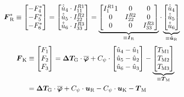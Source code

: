 \begin{equation}
\begin{split}
\boldsymbol{F}^*_{\text{R}} &\equiv \begin{bmatrix}-F^*_{\text{4}} \\ -F^*_{\text{5}} \\ -F^*_{\text{6}} \end{bmatrix} = 
\begin{bmatrix}
\hat{\dot{u}}_{\text{4}} \cdot I^{R1}_{\text{11}} \\ \hat{\dot{u}}_{\text{5}}\cdot I^{R2}_{\text{22}} \\ \hat{\dot{u}}_{\text{6}}\cdot I^{R3}_{\text{33}}
\end{bmatrix} = \underbrace{\begin{bmatrix}
I^{R1}_{\text{1}}1 & 0 & 0 \\ 0 & I^{R2}_{\text{22}} & 0 \\ 0 & 0 & I^{R3}_{\text{33}}
\end{bmatrix}}_{\equiv \boldsymbol{I}_{\text{R}}} \cdot \underbrace{\begin{bmatrix}
\hat{\dot{u}}_{\text{4}} \\ \hat{\dot{u}}_{\text{5}} \\ \hat{\dot{u}}_{\text{6}}
\end{bmatrix}}_{\equiv \boldsymbol{\dot{u}}_{\text{R}}}
\end{split}
\end{equation}
\begin{equation}
\begin{split}
\boldsymbol{F}_{\text{K}} &\equiv \begin{bmatrix}
F_{\text{1}} \\ F_{\text{2}} \\ F_{\text{3}}
\end{bmatrix} =\boldsymbol{\Delta T_{\text{G}}}\cdot \overline{\boldsymbol{\varphi}} + C_{\psi}\cdot \begin{bmatrix}
\hat{u}_{\text{4}} - \hat{u}_{\text{1}} \\ \hat{u}_{\text{5}} - \hat{u}_{\text{2}} \\ \hat{u}_{\text{6}} - \hat{u}_{\text{3}}
\end{bmatrix} - \underbrace{\begin{bmatrix}
T_{\text{M1}} \\ T_{\text{M2}} \\ T_{\text{M3}}
\end{bmatrix}}_{\equiv \boldsymbol{T}_{\text{M}}}
\\
&= \boldsymbol{\Delta T_{\text{G}}} \cdot \overline{\boldsymbol{\varphi}} + C_{\psi} \cdot \boldsymbol{u}_{\text{R}} - C_{\psi} \cdot \boldsymbol{u}_{\text{K}}  - \boldsymbol{T}_{\text{M}}
\end{split}
\end{equation}

